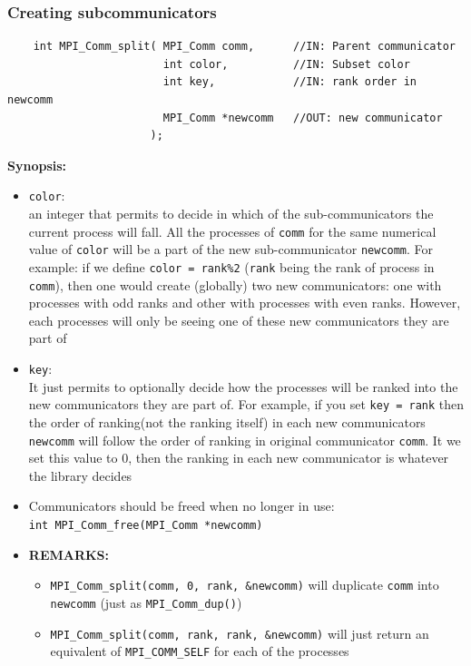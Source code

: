 \documentclass[12pt, a4paper]{report}
\begin{document}
\subsubsection{Creating subcommunicators}
\begin{verbatim}
    int MPI_Comm_split( MPI_Comm comm,      //IN: Parent communicator
                        int color,          //IN: Subset color
                        int key,            //IN: rank order in newcomm
                        MPI_Comm *newcomm   //OUT: new communicator
                      );
\end{verbatim}
{\bfseries{Synopsis:}}
\begin{itemize}
    \item \verb$color$: \\
          an integer that permits to decide in which of the sub-communicators the current process will fall. All the processes of \verb$comm$ for the same 
          numerical value of \verb$color$ will be a part of the new sub-communicator \verb$newcomm$. For example: if we define \verb$color = rank%2$  
          (\verb$rank$ being the rank of process in \verb$comm$), then one would create (globally) two new communicators: one with processes with odd ranks
          and other with processes with even ranks. However, each processes will only be seeing one of these new communicators they are part of
    \item \verb$key$: \\
          It just permits to optionally decide how the processes will be ranked into the new communicators they are part of. For example, if you set 
          \verb$key = rank$ then the order of ranking(not the ranking itself) in each new communicators \verb$newcomm$ will follow the order of ranking in 
          original communicator \verb$comm$. It we set this value to 0, then the ranking in each new communicator is whatever the library decides
    \item Communicators should be freed when no longer in use:\\ \verb$int MPI_Comm_free(MPI_Comm *newcomm)$
    \item {\bfseries{REMARKS:}}
    \begin{itemize}
        \item \verb$MPI_Comm_split(comm, 0, rank, &newcomm)$ will duplicate \verb$comm$ into \verb$newcomm$ (just as \verb$MPI_Comm_dup()$)
        \item \verb$MPI_Comm_split(comm, rank, rank, &newcomm)$ will just return an equivalent of \verb$MPI_COMM_SELF$ for each of the processes

\end{itemize}
\end{itemize}
\end{document}
